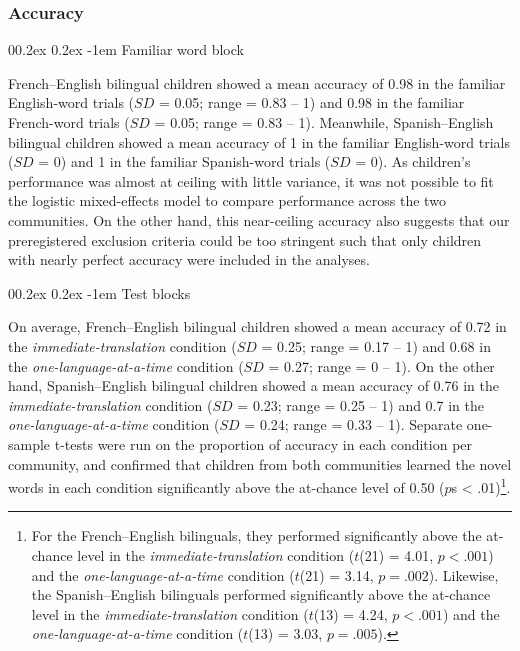\documentclass[
  man,floatsintext]{apa7}
\makeatletter
\let\oldparagraph\paragraph
\renewcommand{\paragraph}[1]{\oldparagraph{#1}\mbox{}}
\renewcommand{\paragraph}{\@startsection{paragraph}{4}{\parindent}%
  {0\baselineskip \@plus 0.2ex \@minus 0.2ex}%
  {-1em}%
  {\normalfont\normalsize\bfseries\itshape\typesectitle}}
\renewcommand{\paragraph}{\@startsection{paragraph}{4}{\parindent}%
  {0\baselineskip \@plus 0.2ex \@minus 0.2ex}%
  {-1em}%
  {\normalfont\normalsize\bfseries\typesectitle}}
\makeatother
\begin{document}
\hypertarget{accuracy}{%
\subsubsection{Accuracy}\label{accuracy}}

\hypertarget{familiar-word-block}{%
\paragraph{Familiar word block}\label{familiar-word-block}}

French--English bilingual children showed a mean accuracy of 0.98 in the familiar English-word trials (\(SD\) = 0.05; range = 0.83 -- 1) and 0.98 in the familiar French-word trials (\(SD\) = 0.05; range = 0.83 -- 1). Meanwhile, Spanish--English bilingual children showed a mean accuracy of 1 in the familiar English-word trials (\(SD\) = 0) and 1 in the familiar Spanish-word trials (\(SD\) = 0). As children's performance was almost at ceiling with little variance, it was not possible to fit the logistic mixed-effects model to compare performance across the two communities. On the other hand, this near-ceiling accuracy also suggests that our preregistered exclusion criteria could be too stringent such that only children with nearly perfect accuracy were included in the analyses.

\hypertarget{test-blocks}{%
\paragraph{Test blocks}\label{test-blocks}}

On average, French--English bilingual children showed a mean accuracy of 0.72 in the \emph{immediate-translation} condition (\(SD\) = 0.25; range = 0.17 -- 1) and 0.68 in the \emph{one-language-at-a-time} condition (\(SD\) = 0.27; range = 0 -- 1). On the other hand, Spanish--English bilingual children showed a mean accuracy of 0.76 in the \emph{immediate-translation} condition (\(SD\) = 0.23; range = 0.25 -- 1) and 0.7 in the \emph{one-language-at-a-time} condition (\(SD\) = 0.24; range = 0.33 -- 1). Separate one-sample t-tests were run on the proportion of accuracy in each condition per community, and confirmed that children from both communities learned the novel words in each condition significantly above the at-chance level of 0.50 (\(p\)s \textless{} .01)\footnote{For the French--English bilinguals, they performed significantly above the at-chance level in the \emph{immediate-translation} condition (\(t\)(21) = 4.01, \(p < .001\)) and the \emph{one-language-at-a-time} condition (\(t\)(21) = 3.14, \(p = .002\)). Likewise, the Spanish--English bilinguals performed significantly above the at-chance level in the \emph{immediate-translation} condition (\(t\)(13) = 4.24, \(p < .001\)) and the \emph{one-language-at-a-time} condition (\(t\)(13) = 3.03, \(p = .005\)).}.
\end{document}
